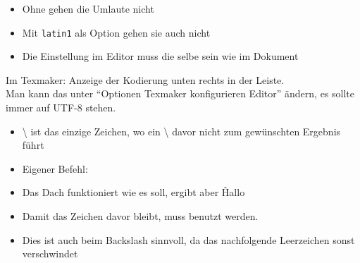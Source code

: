 %
{\begin{itemize}
        \item Ohne  gehen die Umlaute nicht
        \item Mit \texttt{latin1} als Option gehen sie auch nicht \pause
        \item[\textrightarrow] Die Einstellung im Editor muss die selbe sein wie im Dokument
    \end{itemize}
    
    \bigskip
    Im Texmaker: Anzeige der Kodierung unten rechts in der Leiste.\\
    Man kann das unter \enquote{Optionen \textrightarrow{} Texmaker konfigurieren \textrightarrow{} Editor} ändern, es sollte immer auf UTF-8 stehen.
}


%
{
    \begin{itemize}
        \item \textbackslash{} ist das einzige Zeichen, wo ein \textbackslash{}
            davor nicht zum gewünschten Ergebnis führt
        \item[\textrightarrow] Eigener Befehl: \pause
        \medskip
        \item Das Dach funktioniert wie es soll, ergibt aber \^ Hallo
        \item[\textrightarrow] Damit das Zeichen davor bleibt, muss \cmd{\^{}\{\}}
            benutzt werden.\pause
        \medskip
        \item[\textrightarrow] Dies ist auch beim Backslash sinnvoll, da das
            nachfolgende Leerzeichen sonst verschwindet
    \end{itemize}
}
